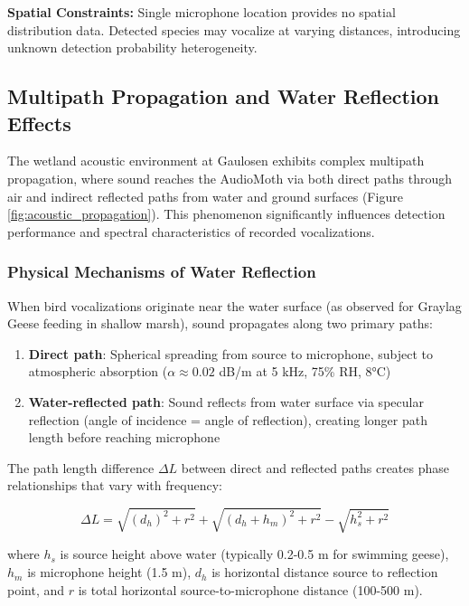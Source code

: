 \documentclass[twocolumn]{article}
\begin{document}
\textbf{Spatial Constraints:} Single microphone location provides no spatial distribution data. Detected species may vocalize at varying distances, introducing unknown detection probability heterogeneity.

\subsection{Multipath Propagation and Water Reflection Effects}

The wetland acoustic environment at Gaulosen exhibits complex multipath propagation, where sound reaches the AudioMoth via both direct paths through air and indirect reflected paths from water and ground surfaces (Figure \ref{fig:acoustic_propagation}). This phenomenon significantly influences detection performance and spectral characteristics of recorded vocalizations.

\subsubsection{Physical Mechanisms of Water Reflection}

When bird vocalizations originate near the water surface (as observed for Graylag Geese feeding in shallow marsh), sound propagates along two primary paths:

\begin{enumerate}
\item \textbf{Direct path}: Spherical spreading from source to microphone, subject to atmospheric absorption ($\alpha \approx 0.02$ dB/m at 5 kHz, 75\% RH, 8°C)

\item \textbf{Water-reflected path}: Sound reflects from water surface via specular reflection (angle of incidence = angle of reflection), creating longer path length before reaching microphone
\end{enumerate}

The path length difference $\Delta L$ between direct and reflected paths creates phase relationships that vary with frequency:

\begin{equation}
\Delta L = \sqrt{(d_h)^2 + r^2} + \sqrt{(d_h + h_m)^2 + r^2} - \sqrt{h_s^2 + r^2}
\label{eq:path_length_difference}
\end{equation}

where $h_s$ is source height above water (typically 0.2-0.5 m for swimming geese), $h_m$ is microphone height (1.5 m), $d_h$ is horizontal distance source to reflection point, and $r$ is total horizontal source-to-microphone distance (100-500 m).
\end{document}
